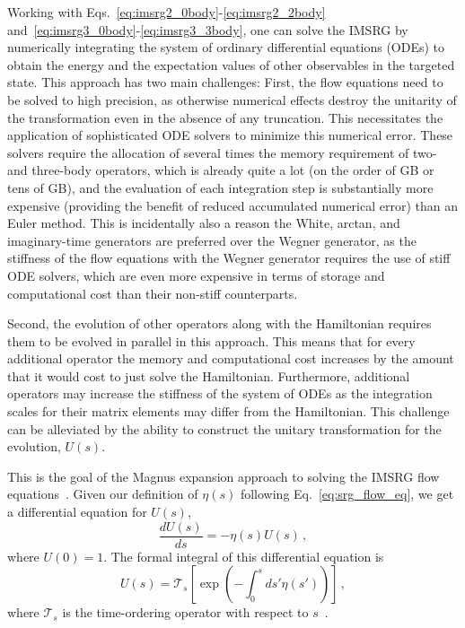 Working with Eqs.~\eqref{eq:imsrg2_0body}-\eqref{eq:imsrg2_2body}
and~\eqref{eq:imsrg3_0body}-\eqref{eq:imsrg3_3body},
one can solve the IMSRG by numerically integrating
the system of ordinary differential equations (ODEs)
to obtain the energy and the expectation values of other observables in the targeted state.
This approach has two main challenges:
First, the flow equations need to be solved to high precision,
as otherwise numerical effects destroy the unitarity of the transformation
even in the absence of any truncation.
This necessitates the application of sophisticated ODE solvers
to minimize this numerical error.
These solvers require the allocation of several times the memory requirement
of two- and three-body operators,
which is already quite a lot (on the order of GB or tens of GB),
and the evaluation of each integration step is substantially more expensive
(providing the benefit of reduced accumulated numerical error)
than an Euler method.
This is incidentally also a reason the White, arctan, and imaginary-time generators
are preferred over the Wegner generator,
as the stiffness of the flow equations with the Wegner generator
requires the use of stiff ODE solvers,
which are even more expensive in terms of storage and computational cost
than their non-stiff counterparts.

Second, the evolution of other operators along with the Hamiltonian
requires them to be evolved in parallel in this approach.
This means that for every additional operator the memory and computational cost
increases by the amount that it would cost to just solve the Hamiltonian.
Furthermore, additional operators may increase the stiffness of the system of ODEs
as the integration scales for their matrix elements may differ from the Hamiltonian.
This challenge can be alleviated by the ability to construct the unitary transformation
for the evolution, $U(s)$.

This is the goal of the Magnus expansion approach to solving the IMSRG flow equations~\cite{Morr15magnus}.
Given our definition of $\eta(s)$ following Eq.~\eqref{eq:srg_flow_eq},
we get a differential equation for $U(s)$,
\begin{equation}
  \frac{dU(s)}{ds} = - \eta(s) U(s)\,,
\end{equation}
where $U(0) = 1$.
The formal integral of this differential equation is
\begin{equation}
  U(s) = \mathcal{T}_s\left[\exp(-\int_{0}^{s} ds' \eta(s'))\right]\,,
\end{equation}
where $\mathcal{T}_s$ is the time-ordering operator with respect to $s$~\cite{Dyso49timeorder}.

